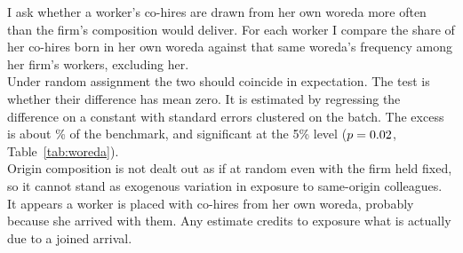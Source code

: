 
\noindent I ask whether a worker's co-hires are drawn from her own woreda more often than the firm's composition would deliver. For each worker I compare the share of her co-hires born in her own woreda against that same woreda's frequency among her firm's workers, excluding her. \\

\noindent Under random assignment the two should coincide in expectation. The test is whether their difference has mean zero. It is estimated by regressing the difference on a constant with standard errors clustered on the batch. The excess is about \pnWoredaExcessPct{}\% of the benchmark, and significant at the 5\% level ($p=0.02{}$, Table~\ref{tab:woreda}). \\

\noindent Origin composition is not dealt out as if at random even with the firm held fixed, so it cannot stand as exogenous variation in exposure to same-origin colleagues. It appears a worker is placed with co-hires from her own woreda, probably because she arrived with them. Any estimate credits to exposure what is actually due to a joined arrival. \\



